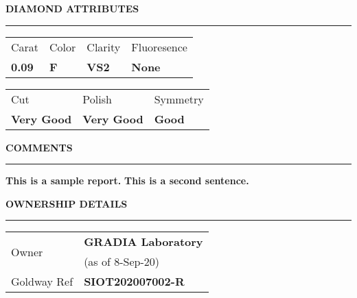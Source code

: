 \documentclass[12pt,landscape]{article}%
\begin{document}
\begin{minipage}[t]{1\textwidth}
\begin{minipage}[t]{0.33333\textwidth}
\begin{minipage}[t]{0.9\textwidth}
\begin{tabular}{l l}
\end{tabular}%
\vspace*{2em}%
\linebreak%
\color{MyBlue}%
\textbf{DIAMOND ATTRIBUTES\newline%
}%
\noindent\rule{\textwidth}{0.5mm}%
\vspace*{1em}%
\linebreak%
\color{MyDarkGrey}%
\renewcommand{\arraystretch}{1.5}%
\setlength{\tabcolsep}{1em}%
\begin{tabular}{l l l l}%
Carat&Color&Clarity&Fluoresence\\%
\textbf{0.09}&\textbf{F}&\textbf{VS2}&\textbf{None}\\%
\end{tabular}%
\vspace*{1.5em}%
\linebreak%
\renewcommand{\arraystretch}{1.5}%
\setlength{\tabcolsep}{1em}%
\begin{tabular}{l l l}%
Cut&Polish&Symmetry\\%
\textbf{Very Good}&\textbf{Very Good}&\textbf{Good}\\%
\end{tabular}%
\vspace*{2em}%
\linebreak%
\color{MyBlue}%
\textbf{COMMENTS\newline%
}%
\noindent\rule{\textwidth}{0.5mm}%
\vspace*{1em}%
\linebreak%
\color{MyDarkGrey}%
\textbf{This is a sample report.}%
\linebreak%
\textbf{This is a second sentence.}%
\end{minipage}%
\end{minipage}%
\begin{minipage}[t]{0.33333\textwidth}%
\centering%
\begin{minipage}[t]{0.9\textwidth}%
\flushleft%
\color{MyBlue}%
\textbf{OWNERSHIP DETAILS\newline%
}%
\noindent\rule{\textwidth}{0.5mm}%
\vspace*{1em}%
\linebreak%
\color{MyDarkGrey}%
\renewcommand{\arraystretch}{1.5}%
\setlength{\tabcolsep}{1em}%
\begin{tabular}{l l}%
\multirow{2}{*}{Owner}&\textbf{GRADIA Laboratory}\\%
&(as of 8{-}Sep{-}20)\\%
Goldway Ref&\textbf{SIOT202007002{-}R}\\%

\end{tabular}
\end{minipage}
\end{minipage}
\end{minipage}
\end{document}
